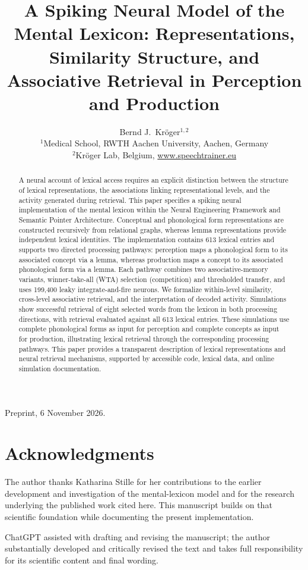 \documentclass[12pt]{article}
\title{\textbf{A Spiking Neural Model of the Mental Lexicon: Representations, Similarity Structure, and Associative Retrieval in Perception and Production}}
\author{Bernd J.~Kröger$^{1,2}$\\[1ex]
{\small $^{1}$Medical School, RWTH Aachen University, Aachen, Germany}\\
{\small $^{2}$Kröger Lab, Belgium, \url{www.speechtrainer.eu}}\\[2ex]}
\date{}
\begin{document}
\maketitle
\begingroup\footnotesize\noindent Preprint, 6 November 2026.\par\endgroup
\begin{abstract}
A neural account of lexical access requires an explicit distinction between the structure of lexical representations, the associations linking representational levels, and the activity generated during retrieval. This paper specifies a spiking neural implementation of the mental lexicon within the Neural Engineering Framework and Semantic Pointer Architecture. Conceptual and phonological form representations are constructed recursively from relational graphs, whereas lemma representations provide independent lexical identities. The implementation contains 613 lexical entries and supports two directed processing pathways: perception maps a phonological form to its associated concept via a lemma, whereas production maps a concept to its associated phonological form via a lemma. Each pathway combines two associative-memory variants, winner-take-all (WTA) selection (competition) and thresholded transfer, and uses 199,400 leaky integrate-and-fire neurons. We formalize within-level similarity, cross-level associative retrieval, and the interpretation of decoded activity. Simulations show successful retrieval of eight selected words from the lexicon in both processing directions, with retrieval evaluated against all 613 lexical entries. These simulations use complete phonological forms as input for perception and complete concepts as input for production, illustrating lexical retrieval through the corresponding processing pathways. This paper provides a transparent description of lexical representations and neural retrieval mechanisms, supported by accessible code, lexical data, and online simulation documentation.
\end{abstract}










\section*{Acknowledgments}
The author thanks Katharina Stille for her contributions to the earlier development and investigation of the mental-lexicon model and for the research underlying the published work cited here. This manuscript builds on that scientific foundation while documenting the present implementation.

ChatGPT assisted with drafting and revising the manuscript; the author substantially developed and critically revised the text and takes full responsibility for its scientific content and final wording.


\appendix

\end{document}
